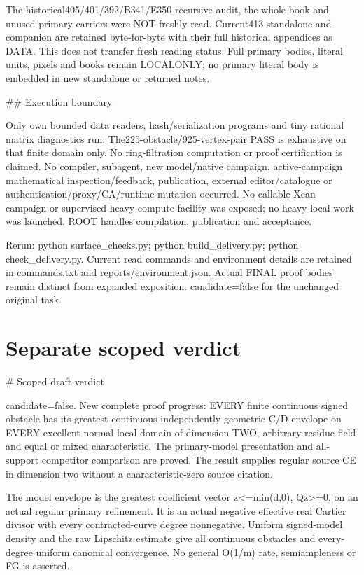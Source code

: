 \documentclass[11pt]{article}
\begin{document}
The historical405/401/392/B341/E350 recursive audit, the whole book and unused primary carriers were NOT freshly read. Current413 standalone and companion are retained byte-for-byte with their full historical appendices as DATA. This does not transfer fresh reading status. Full primary bodies, literal units, pixels and books remain LOCALONLY; no primary literal body is embedded in new standalone or returned notes.

\#\# Execution boundary

Only own bounded data readers, hash/serialization programs and tiny rational matrix diagnostics run. The225-obstacle/925-vertex-pair PASS is exhaustive on that finite domain only. No ring-filtration computation or proof certification is claimed. No compiler, subagent, new model/native campaign, active-campaign mathematical inspection/feedback, publication, external editor/catalogue or authentication/proxy/CA/runtime mutation occurred. No callable Xean campaign or supervised heavy-compute facility was exposed; no heavy local work was launched. ROOT handles compilation, publication and acceptance.

Rerun: python surface\_checks.py; python build\_delivery.py; python check\_delivery.py. Current read commands and environment details are retained in commands.txt and reports/environment.json. Actual FINAL proof bodies remain distinct from expanded exposition. candidate=false for the unchanged original task.


\section*{Separate scoped verdict}
\# Scoped draft verdict

candidate=false. New complete proof progress: EVERY finite continuous signed obstacle has its greatest continuous independently geometric C/D envelope on EVERY excellent normal local domain of dimension TWO, arbitrary residue field and equal or mixed characteristic. The primary-model presentation and all-support competitor comparison are proved. The result supplies regular source CE in dimension two without a characteristic-zero source citation.

The model envelope is the greatest coefficient vector z<=min(d,0), Qz>=0, on an actual regular primary refinement. It is an actual negative effective real Cartier divisor with every contracted-curve degree nonnegative. Uniform signed-model density and the raw Lipschitz estimate give all continuous obstacles and every-degree uniform canonical convergence. No general O(1/m) rate, semiampleness or FG is asserted.
\end{document}
